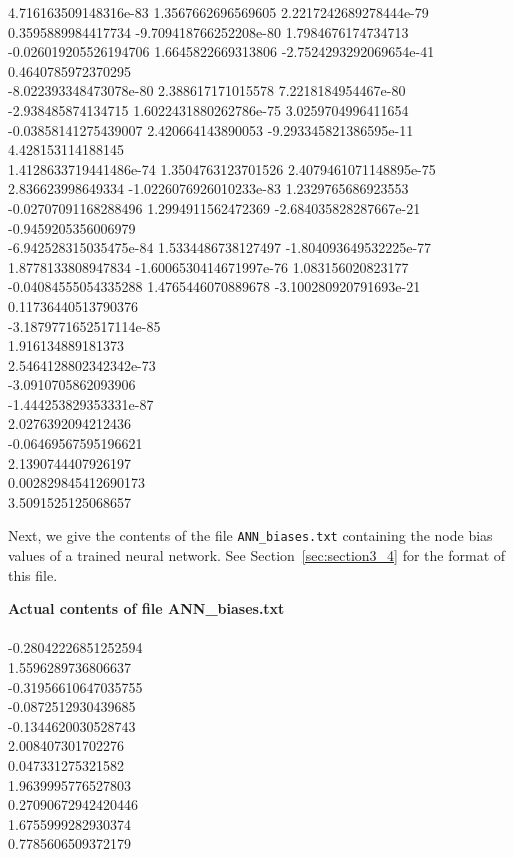 \documentclass[11pt,titlepage,dvipdfmx,twoside]{article}
\begin{document}
\begin{oframed}
4.716163509148316e-83 1.3567662696569605 2.2217242689278444e-79 0.3595889984417734 -9.709418766252208e-80 1.7984676174734713 -0.026019205526194706 1.6645822669313806 -2.7524293292069654e-41 0.4640785972370295 \\
-8.022393348473078e-80 2.388617171015578 7.2218184954467e-80 -2.938485874134715 1.6022431880262786e-75 3.0259704996411654 -0.03858141275439007 2.420664143890053 -9.293345821386595e-11 4.428153114188145 \\
1.4128633719441486e-74 1.3504763123701526 2.4079461071148895e-75 2.836623998649334 -1.0226076926010233e-83 1.2329765686923553 -0.02707091168288496 1.2994911562472369 -2.684035828287667e-21 -0.9459205356006979 \\
-6.942528315035475e-84 1.5334486738127497 -1.804093649532225e-77 1.8778133808947834 -1.6006530414671997e-76 1.083156020823177 -0.04084555054335288 1.4765446070889678 -3.100280920791693e-21 0.11736440513790376 \\
-3.1879771652517114e-85 \\
1.916134889181373 \\
2.5464128802342342e-73 \\
-3.0910705862093906 \\
-1.444253829353331e-87 \\
2.0276392094212436 \\
-0.06469567595196621 \\
2.1390744407926197 \\
0.002829845412690173 \\
3.5091525125068657 
\end{oframed}

\bigskip

Next, we give the contents of the file {\tt ANN\_biases.txt}
containing the node bias values of a trained neural network.
See Section~\ref{sec:section3_4} for the format of this file.


\begin{oframed}
{\bf  Actual contents of file ANN\_biases.txt}\\\\
-0.28042226851252594  \\
1.5596289736806637  \\
-0.31956610647035755  \\
-0.0872512930439685  \\
-0.1344620030528743  \\
2.008407301702276  \\
0.047331275321582  \\
1.9639995776527803  \\
0.27090672942420446  \\
1.6755999282930374  \\
0.7785606509372179
\end{oframed}
\end{document}

